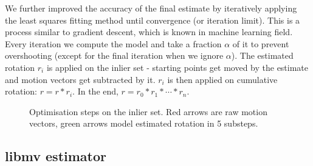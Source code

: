 \documentclass[11pt,english]{report}
\begin{document}
We further improved the accuracy of the final estimate by iteratively applying the least squares fitting method until convergence (or iteration limit). This is a process similar to gradient descent, which is known in machine learning field. Every iteration we compute the model and take a fraction $\alpha$ of it to prevent overshooting (except for the final iteration when we ignore $\alpha$). The estimated rotation $r_i$ is applied on the inlier set - starting points get moved by the estimate and motion vectors get subtracted by it. $r_i$ is then applied on cumulative rotation: $r = r * r_i$. In the end, $r = r_0 * r_1 * \cdots * r_n$.

\begin{figure}[!ht]
	\centering
	\caption{\centering Optimisation steps on the inlier set. Red arrows are raw motion vectors, green arrows model estimated rotation in 5 substeps.}
\end{figure}

\subsection{libmv estimator}
\end{document}
